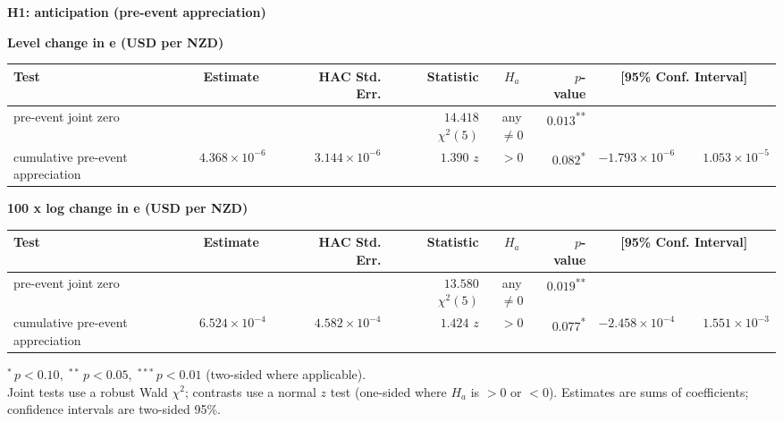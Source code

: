 \documentclass[10pt]{article}
\begin{document}
\begin{center}\large\textbf{H1: anticipation (pre-event appreciation)}\end{center}
\noindent\textbf{Level change in e (USD per NZD)}\\[0.3em]
\begin{tabular}{@{}>{\raggedright\arraybackslash}p{2.9in}|r@{}l rrcr rr@{}}
\hline
Test & \multicolumn{2}{c}{Estimate} & HAC Std. Err. & Statistic & $H_a$ & $p$-value & \multicolumn{2}{c}{[95\% Conf. Interval]} \\
\hline
pre-event joint zero &  &  &  & $\phantom{-}14.418$ $\chi^2(5)$ & any $\neq 0$ & $0.013$\textsuperscript{**} &  &  \\
cumulative pre-event appreciation & $\phantom{-}4.368\!\times\!10^{-6}$ &  & $\phantom{-}3.144\!\times\!10^{-6}$ & $\phantom{-}1.390$ $z$ & $>0$ & $0.082$\textsuperscript{*} & $-1.793\!\times\!10^{-6}$ & $\phantom{-}1.053\!\times\!10^{-5}$ \\
\hline
\end{tabular}
\vspace{1em}

\noindent\textbf{100 x log change in e (USD per NZD)}\\[0.3em]
\begin{tabular}{@{}>{\raggedright\arraybackslash}p{2.9in}|r@{}l rrcr rr@{}}
\hline
Test & \multicolumn{2}{c}{Estimate} & HAC Std. Err. & Statistic & $H_a$ & $p$-value & \multicolumn{2}{c}{[95\% Conf. Interval]} \\
\hline
pre-event joint zero &  &  &  & $\phantom{-}13.580$ $\chi^2(5)$ & any $\neq 0$ & $0.019$\textsuperscript{**} &  &  \\
cumulative pre-event appreciation & $\phantom{-}6.524\!\times\!10^{-4}$ &  & $\phantom{-}4.582\!\times\!10^{-4}$ & $\phantom{-}1.424$ $z$ & $>0$ & $0.077$\textsuperscript{*} & $-2.458\!\times\!10^{-4}$ & $\phantom{-}1.551\!\times\!10^{-3}$ \\
\hline
\end{tabular}
\vspace{1em}

{\footnotesize $^{*}\,p<0.10,\;^{**}\,p<0.05,\;^{***}\,p<0.01$ (two-sided where applicable).}
{\footnotesize\\ Joint tests use a robust Wald $\chi^2$; contrasts use a normal $z$ test (one-sided where $H_a$ is $>0$ or $<0$). Estimates are sums of coefficients; confidence intervals are two-sided 95\%.}
\end{document}
